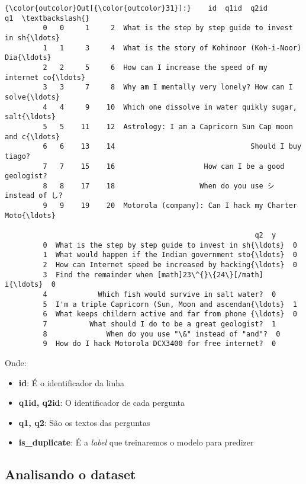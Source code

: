\documentclass[11pt]{article}
\begin{document}
\begin{Verbatim}[commandchars=\\\{\}]
{\color{outcolor}Out[{\color{outcolor}31}]:}    id  q1id  q2id                                                 q1  \textbackslash{}
         0   0     1     2  What is the step by step guide to invest in sh{\ldots}   
         1   1     3     4  What is the story of Kohinoor (Koh-i-Noor) Dia{\ldots}   
         2   2     5     6  How can I increase the speed of my internet co{\ldots}   
         3   3     7     8  Why am I mentally very lonely? How can I solve{\ldots}   
         4   4     9    10  Which one dissolve in water quikly sugar, salt{\ldots}   
         5   5    11    12  Astrology: I am a Capricorn Sun Cap moon and c{\ldots}   
         6   6    13    14                                Should I buy tiago?   
         7   7    15    16                     How can I be a good geologist?   
         8   8    17    18                    When do you use シ instead of し?   
         9   9    19    20  Motorola (company): Can I hack my Charter Moto{\ldots}   
         
                                                           q2  y  
         0  What is the step by step guide to invest in sh{\ldots}  0  
         1  What would happen if the Indian government sto{\ldots}  0  
         2  How can Internet speed be increased by hacking{\ldots}  0  
         3  Find the remainder when [math]23\^{}\{24\}[/math] i{\ldots}  0  
         4            Which fish would survive in salt water?  0  
         5  I'm a triple Capricorn (Sun, Moon and ascendan{\ldots}  1  
         6  What keeps childern active and far from phone {\ldots}  0  
         7          What should I do to be a great geologist?  1  
         8              When do you use "\&" instead of "and"?  0  
         9  How do I hack Motorola DCX3400 for free internet?  0  
\end{Verbatim}
            
Onde: 
\begin{itemize}
	\item \textbf{id}: É o identificador da linha
	\item \textbf{q1id, q2id}: O identificador de cada pergunta
	\item \textbf{q1, q2}: São os textos das perguntas
	\item \textbf{is\_duplicate}: É a \emph{label} que treinaremos o modelo para predizer    
\end{itemize}

    \subsection{Analisando o dataset}\label{analisando-o-dataset}
\end{document}
